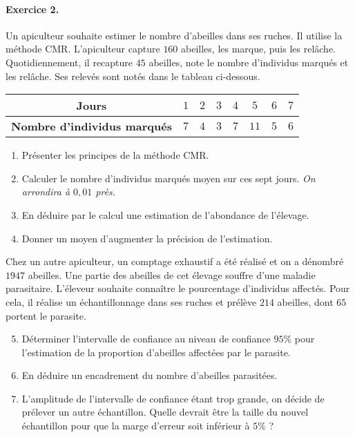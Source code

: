 \documentclass[11pt]{article}
\begin{document}
\paragraph{Exercice 2.} Un apiculteur souhaite estimer le nombre d'abeilles dans
ses ruches. Il utilise la méthode CMR. L'apiculteur capture $160$ abeilles, les
marque, puis les rel\^ache. Quotidiennement, il recapture $45$ abeilles, note le
nombre d'individus marqués et les rel\^ache. Ses relevés sont notés dans le
tableau ci-dessous.
\begin{center}
  \renewcommand{\arraystretch}{1.2}
  \begin{tabular}[]{|c|c|c|c|c|c|c|c|}
    \hline
    \textbf{Jours} & $1$ & $2$ & $3$ & $4$ & $5$ & $6$ & $7$ \\
    \hline
    \textbf{Nombre d'individus marqués} & $7$ & $4$ & $3$ & $7$ & $11$ & $5$ &
    $6$ \\
    \hline
  \end{tabular}
\end{center}
\begin{enumerate}
  \item Présenter les principes de la méthode CMR.
  \item Calculer le nombre d'individus marqués moyen sur ces sept jours.
    \emph{On arrondira à $0,01$ près.}
  \item En déduire par le calcul une estimation de l'abondance de l'élevage.
  \item Donner un moyen d'augmenter la précision de l'estimation.
\end{enumerate}
Chez un autre apiculteur, un comptage exhaustif a été réalisé et on a dénombré
$1947$ abeilles. Une partie des abeilles de cet élevage souffre d'une maladie
parasitaire. L'éleveur souhaite connaître le pourcentage d'individus affectés.
Pour cela, il réalise un échantillonnage dans ses ruches et prélève $214$
abeilles, dont $65$ portent le parasite.
\begin{enumerate}
    \setcounter{enumi}{4}
  \item Déterminer l'intervalle de confiance au niveau de confiance $95$\% pour
    l'estimation de la proportion d'abeilles affectées par le parasite.
  \item En déduire un encadrement du nombre d'abeilles parasitées.
  \item L'amplitude de l'intervalle de confiance étant trop grande, on décide de prélever un
    autre échantillon. Quelle devrait être la taille du nouvel échantillon pour
    que la marge d'erreur soit inférieur à $5$\% ?
\end{enumerate}
\end{document}
